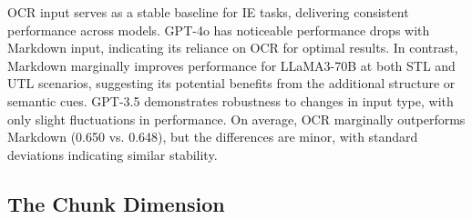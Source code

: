OCR input serves as a stable baseline for IE tasks, delivering consistent performance across models. GPT-4o has noticeable performance drops with Markdown input, indicating its reliance on OCR for optimal results. In contrast, Markdown marginally improves performance for LLaMA3-70B at both STL and UTL scenarios, suggesting its potential benefits from the additional structure or semantic cues. GPT-3.5 demonstrates robustness to changes in input type, with only slight fluctuations in performance. On average, OCR marginally outperforms Markdown (0.650 vs. 0.648), but the differences are minor, with standard deviations indicating similar stability. 

\subsection{The Chunk Dimension}


